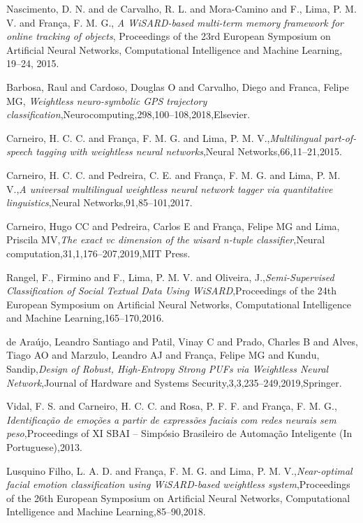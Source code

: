 \documentclass[12pt]{article}
\begin{document}
\begin{footnotesize}
\begin{thebibliography}{99}
Nascimento, D. N. and de Carvalho, R. L. and Mora-Camino and F., Lima, P. M. V. and Fran\c{c}a, F. M. G., \emph{A WiSARD-based multi-term memory framework for online tracking of objects}, Proceedings of the 23rd European Symposium on Artificial Neural Networks, Computational Intelligence and Machine Learning, 19--24, 2015.

Barbosa, Raul and Cardoso, Douglas O and Carvalho, Diego and Franca, Felipe MG, \emph{Weightless neuro-symbolic GPS trajectory classification},Neurocomputing,298,100--108,2018,Elsevier.

Carneiro, H. C. C. and Fran\c{c}a, F. M. G. and Lima, P. M. V.,\emph{Multilingual part-of-speech tagging with weightless neural networks},Neural Networks,66,11--21,2015.

Carneiro, H. C. C. and Pedreira, C. E. and Fran\c{c}a, F. M. G. and Lima, P. M. V.,\emph{A universal multilingual weightless neural network tagger via quantitative linguistics},Neural Networks,91,85--101,2017.

Carneiro, Hugo CC and Pedreira, Carlos E and Fran{\c{c}}a, Felipe MG and Lima, Priscila MV,\emph{The exact vc dimension of the wisard n-tuple classifier},Neural computation,31,1,176--207,2019,MIT Press.

Rangel, F., Firmino and F., Lima, P. M. V. and Oliveira, J.,\emph{Semi-Supervised Classification of Social Textual Data Using WiSARD},Proceedings of the 24th European Symposium on Artificial Neural Networks, Computational Intelligence and Machine Learning,165--170,2016.

de Ara{\'u}jo, Leandro Santiago and Patil, Vinay C and Prado, Charles B and Alves, Tiago AO and Marzulo, Leandro AJ and Fran{\c{c}}a, Felipe MG and Kundu, Sandip,\emph
{Design of Robust, High-Entropy Strong PUFs via Weightless Neural Network},Journal of Hardware and Systems Security,3,3,235--249,2019,Springer.

Vidal, F. S. and Carneiro, H. C. C. and Rosa, P. F. F. and Fran\c{c}a, F. M. G., \emph{Identifica\c{c}\~{a}o de emo\c{c}\~{o}es a partir de express\~{o}es faciais com redes neurais sem peso},Proceedings of XI SBAI -- Simp\'{o}sio Brasileiro de Automa\c{c}\~{a}o Inteligente (In Portuguese),2013.

Lusquino Filho, L. A. D. and Fran\c{c}a, F. M. G. and Lima, P. M. V.,\emph{Near-optimal facial emotion classification using WiSARD-based weightless system},Proceedings of the 26th European Symposium on Artificial Neural Networks, Computational Intelligence and Machine Learning,85--90,2018.


\end{thebibliography}
\end{footnotesize}
\end{document}
